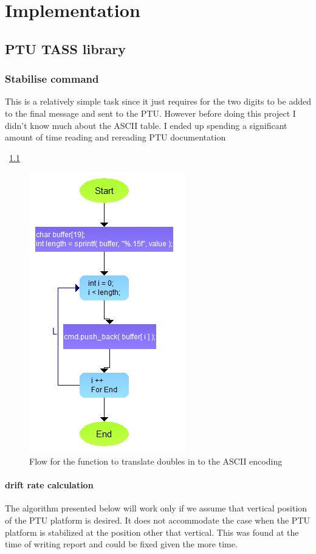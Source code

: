 \chapter{Implementation}
 
\section{PTU TASS library}
\subsection{Stabilise command}
\label{stabilize_implementation}
 This is a relatively simple task since it just requires for the two digits to be added to the final message and sent to the PTU. However before doing this project I didn't know much about the ASCII table. I ended up spending a significant amount of time reading and rereading PTU documentation
 
 ~\ref{fig:pushDfunction}
 
 \begin{figure}[H]
 \centering
 \centerline{\includegraphics[scale=0.65]{./images/pushDfunction}}
 \caption{Flow for the function to translate doubles in to the ASCII encoding}
 \label{fig:pushDfunction}
 \end{figure}
 \subsubsection{drift rate calculation}
 
 The algorithm presented below will work only if we assume that vertical position of the PTU platform is desired. It does not accommodate the case when the PTU  platform is stabilized at the position other that vertical. This was found at the time of writing report and could be fixed given the more time.
